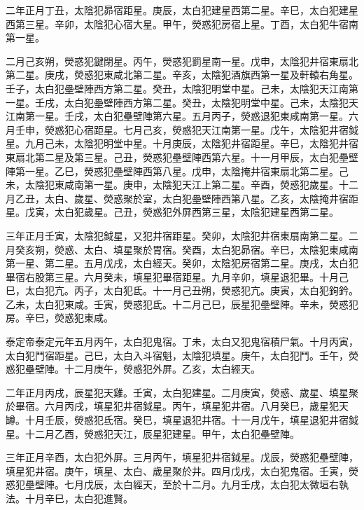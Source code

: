 \begin{pinyinscope}
 二年正月丁丑，太陰犯昴宿距星。庚辰，太白犯建星西第二星。辛巳，太白犯建星西第三星。辛卯，太陰犯心宿大星。甲午，熒惑犯房宿上星。丁酉，太白犯牛宿南第一星。



 二月己亥朔，熒惑犯鍵閉星。丙午，熒惑犯罰星南一星。戊申，太陰犯井宿東扇北第二星。庚戌，熒惑犯東咸北第二星。辛亥，太陰犯酒旗西第一星及軒轅右角星。壬子，太白犯壘壁陣西方第二星。癸丑，太陰犯明堂中星。己未，太陰犯天江南第一星。壬戌，太白犯壘壁陣西方第二星。癸丑，太陰犯明堂中星。己未，太陰犯天江南第一星。壬戌，太白犯壘壁陣第六星。五月丙子，熒惑退犯東咸南第一星。六月壬申，熒惑犯心宿距星。七月己亥，熒惑犯天江南第一星。戊午，太陰犯井宿鉞星。九月己未，太陰犯明堂中星。十月庚辰，太陰犯井宿距星。辛巳，太陰犯井宿東扇北第二星及第三星。己丑，熒惑犯壘壁陣西第六星。十一月甲辰，太白犯壘壁陣第一星。乙巳，熒惑犯壘壁陣西第八星。戊申，太陰掩井宿東扇北第二星。己未，太陰犯東咸南第一星。庚申，太陰犯天江上第二星。辛酉，熒惑犯歲星。十二月乙丑，太白、歲星、熒惑聚於室，太白犯壘壁陣西第八星。乙亥，太陰掩井宿距星。戊寅，太白犯歲星。己丑，熒惑犯外屏西第三星，太陰犯建星西第二星。



 三年正月壬寅，太陰犯鉞星，又犯井宿距星。癸卯，太陰犯井宿東扇南第二星。二月癸亥朔，熒惑、太白、填星聚於胃宿。癸酉，太白犯昴宿。辛巳，太陰犯東咸南第一星、第二星。五月戊戌，太白經天。癸卯，太陰犯房宿第二星。庚戌，太白犯畢宿右股第三星。六月癸未，填星犯畢宿距星。九月辛卯，填星退犯畢。十月己巳，太白犯亢。丙子，太白犯氐。十一月己丑朔，熒惑犯亢。庚寅，太白犯鉤鈐。乙未，太白犯東咸。壬寅，熒惑犯氐。十二月己巳，辰星犯壘壁陣。辛未，熒惑犯房。辛巳，熒惑犯東咸。



 泰定帝泰定元年五月丙午，太白犯鬼宿。丁未，太白又犯鬼宿積尸氣。十月丙寅，太白犯鬥宿距星。己巳，太白入斗宿魁，太陰犯填星。庚午，太白犯鬥。壬午，熒惑犯壘壁陣。十二月庚午，熒惑犯外屏。乙亥，太白經天。



 二年正月丙戌，辰星犯天雞。壬寅，太白犯建星。二月庚寅，熒惑、歲星、填星聚於畢宿。六月丙戌，填星犯井宿鉞星。丙午，填星犯井宿。八月癸巳，歲星犯天罇。十月壬辰，熒惑犯氐宿。癸巳，填星退犯井宿。十一月戊午，填星退犯井宿鉞星。十二月乙酉，熒惑犯天江，辰星犯建星。甲午，太白犯壘壁陣。



 三年正月辛酉，太白犯外屏。三月丙午，填星犯井宿鉞星。戊辰，熒惑犯壘壁陣，填星犯井宿。庚午，填星、太白、歲星聚於井。四月戊戌，太白犯鬼宿。壬寅，熒惑犯壘壁陣。七月戊辰，太白經天，至於十二月。九月壬戌，太白犯太微垣右執法。十月辛巳，太白犯進賢。




\end{pinyinscope}
